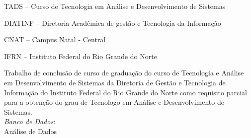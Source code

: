 
\titulo{\Large{\thesistitle}}
\autor{\thesisauthor}
\instituicao
{
	TADS -- Curso de Tecnologia em Análise e Desenvolvimento de
	Sistemas\par
	DIATINF -- Diretoria Acadêmica de gestão e Tecnologia da Informação\par
	CNAT -- Campus Natal - Central\par
	IFRN -- Instituto Federal do Rio Grande do Norte }

\comentario
{
	Trabalho de conclusão de curso de graduação do curso de Tecnologia e Análise em
	Desenvolvimento de Sistemas da Diretoria de Gestão e Tecnologia de Informação
	do Instituto Federal do Rio Grande do Norte como requisito parcial para a
	obtenção do grau de Tecnologo em Análise e Desenvolvimento de
	Sistemas.\bigskip\\
	\textit{Banco de Dados}:\\Análise de Dados
}


\folhaderosto